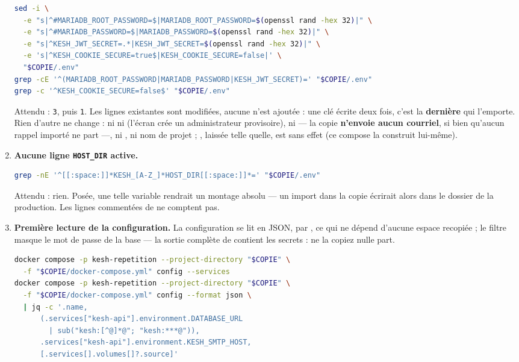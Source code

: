 \documentclass[a4paper,11pt,oneside]{article}
\begin{document}
\begin{enumerate}
\begin{lstlisting}[language=bash]
sed -i \
  -e "s|^#MARIADB_ROOT_PASSWORD=$|MARIADB_ROOT_PASSWORD=$(openssl rand -hex 32)|" \
  -e "s|^#MARIADB_PASSWORD=$|MARIADB_PASSWORD=$(openssl rand -hex 32)|" \
  -e "s|^KESH_JWT_SECRET=.*|KESH_JWT_SECRET=$(openssl rand -hex 32)|" \
  -e 's|^KESH_COOKIE_SECURE=true$|KESH_COOKIE_SECURE=false|' \
  "$COPIE/.env"
grep -cE '^(MARIADB_ROOT_PASSWORD|MARIADB_PASSWORD|KESH_JWT_SECRET)=' "$COPIE/.env"
grep -c '^KESH_COOKIE_SECURE=false$' "$COPIE/.env"
\end{lstlisting}
    Attendu : \texttt{3}, puis \texttt{1}. Les lignes existantes sont modifiées, aucune n'est ajoutée : une clé écrite deux fois, c'est la \textbf{dernière} qui l'emporte. Rien d'autre ne change : ni  ni  (l'écran  crée un administrateur provisoire), ni  --- la copie \textbf{n'envoie aucun courriel}, si bien qu'aucun rappel importé ne part ---, ni , ni nom de projet ; , laissée telle quelle, est sans effet (ce compose la construit lui-même).
    \item \textbf{Aucune ligne \texttt{HOST\_DIR} active.}
\begin{lstlisting}[language=bash]
grep -nE '^[[:space:]]*KESH_[A-Z_]*HOST_DIR[[:space:]]*=' "$COPIE/.env"
\end{lstlisting}
    Attendu : rien. Posée, une telle variable rendrait un montage absolu --- un import dans la copie écrirait alors dans le dossier de la production. Les lignes commentées de \keshpath{.env.example} ne comptent pas.
    \item \textbf{Première lecture de la configuration.} La configuration se lit en JSON, par , ce qui ne dépend d'aucune espace recopiée ; le filtre masque le mot de passe de la base --- la sortie complète de  contient les secrets : ne la copiez nulle part.
\needspace{12\baselineskip}
\begin{lstlisting}[language=bash]
docker compose -p kesh-repetition --project-directory "$COPIE" \
  -f "$COPIE/docker-compose.yml" config --services
docker compose -p kesh-repetition --project-directory "$COPIE" \
  -f "$COPIE/docker-compose.yml" config --format json \
  | jq -c '.name,
      (.services["kesh-api"].environment.DATABASE_URL
        | sub("kesh:[^@]*@"; "kesh:***@")),
      .services["kesh-api"].environment.KESH_SMTP_HOST,
      [.services[].volumes[]?.source]'
\end{lstlisting}

\end{enumerate}
\end{document}
